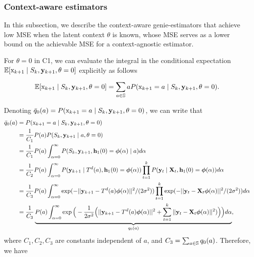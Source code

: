 \documentclass[journal,letterpaper,onecolumn]{IEEEtran}
\begin{document}
\subsubsection{Context-aware estimators}

\label{context_aware_estimators_derivation}

In this subsection, we describe the context-aware genie-estimators that achieve low MSE when the latent context $\theta$ is known, whose MSE serves as a lower bound on the achievable MSE for a context-agnostic estimator.  

For $\theta = 0$ in C1, we can evaluate the integral in the conditional expectation $\mathbb{E}[{\textnormal{x}}_{k+1} \mid S_k, {\mathbf{y}}_{k+1}, \theta = 0]$ explicitly as follows

\begin{align}
\label{eq:contextual_con_mean_estimate}
    \mathbb{E}[{\textnormal{x}}_{k+1} \mid S_k, {\mathbf{y}}_{k+1}, \theta = 0] = \sum_{a\in {\mathbb{S}}} a P({\textnormal{x}}_{k+1} = a \mid S_k, {\mathbf{y}}_{k+1}, \theta = 0).
\end{align}

Denoting $\bar{q}_0(a) = P({\textnormal{x}}_{k+1} = a \mid S_k, {\mathbf{y}}_{k+1}, \theta = 0)$, we can write that
\begin{align*}
    \bar{q}_0(a) &= P({\textnormal{x}}_{k+1} = a \mid S_k, {\mathbf{y}}_{k+1}, \theta = 0) \\
    &= \frac{1}{C_1} P(a) P(S_k, {\mathbf{y}}_{k+1} \mid a, \theta = 0) \\
    &= \frac{1}{C_1}P(a) \int_{\alpha = 0}^\infty  P(S_k, {\mathbf{y}}_{k+1}, {\mathbf{h}}_1(0) = \boldsymbol{\phi}(\alpha) \mid a) d\alpha \\
     &= \frac{1}{C_2}P(a) \int_{\alpha = 0}^\infty P({\mathbf{y}}_{k+1} \mid T^d(a), {\mathbf{h}}_1(0) = \boldsymbol{\phi}(\alpha)) \prod_{t=1}^k P({\mathbf{y}}_t \mid {\mathbf{X}}_t, {\mathbf{h}}_1(0) = \boldsymbol{\phi}(\alpha)) d\alpha \\
    &= \frac{1}{C_3}P(a) \int_{\alpha = 0}^\infty \exp(-||{\mathbf{y}}_{k+1}-T^d(a) \boldsymbol{\phi}(\alpha)||^2/(2\sigma^2))  \prod_{t=1}^k \exp(-||{\mathbf{y}}_t-{\mathbf{X}}_t \boldsymbol{\phi}(\alpha)||^2/(2\sigma^2))d\alpha \\
    &=\frac{1}{C_3} \underbrace{P(a) \int_{\alpha = 0}^\infty \exp\Big(-\frac{1}{2\sigma^2}\Big(||{\mathbf{y}}_{k+1}-T^d(a)\boldsymbol{\phi}(\alpha)||^2+ \sum_{t=1}^k||{\mathbf{y}}_t-{\mathbf{X}}_t \boldsymbol{\phi}(\alpha)||^2) \Big)\Big)d\alpha}_{q_0(a)},
\end{align*}
where $C_1, C_2, C_3$ are constants independent of $a$, and $C_3 = \sum_{a\in{\mathbb{S}}}q_0(a)$. Therefore, we have
\end{document}
